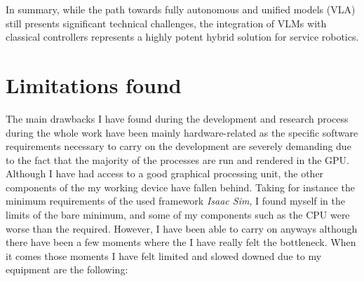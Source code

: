 In summary, while the path towards fully autonomous and unified models (VLA) still presents significant technical challenges, the integration of VLMs with classical controllers represents a highly potent hybrid solution for service robotics.


\section{Limitations found}
The main drawbacks I have found during the development and research process during the whole work have been mainly hardware-related as the specific software requirements necessary to carry on the development are severely demanding due to the fact that the majority of the processes are run and rendered in the GPU. Although I have had access to a good graphical processing unit, the other components of the my working device have fallen behind. Taking for instance the minimum requirements of the used framework \textit{Isaac Sim}, I found myself in the limits of the bare minimum, and some of my components such as the CPU were worse than the required. However, I have been able to carry on anyways although there have been a few moments where the I have really felt the bottleneck. When it comes those moments I have felt limited and slowed downed due to my equipment are the following:

